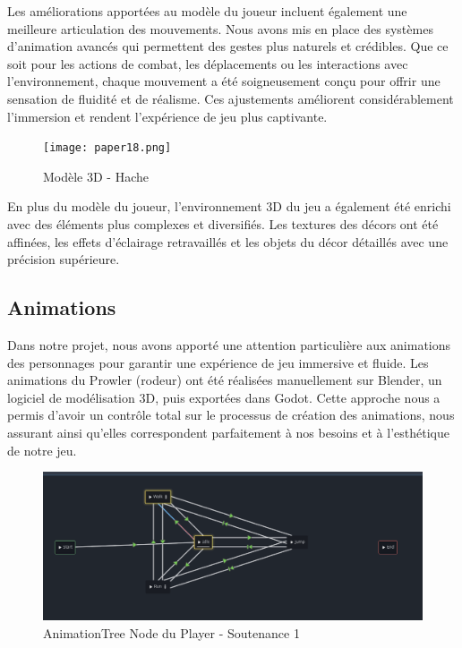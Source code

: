 \documentclass[
	article,			%
	11pt,				%
	oneside,			%
	a4paper,			%
	chapter=TITLE,
	french,			%
	sumario=tradicional
	]{base_nt}
\begin{document}
Les améliorations apportées au modèle du joueur incluent également une meilleure articulation des mouvements. Nous avons mis en place des systèmes d'animation avancés qui permettent des gestes plus naturels et crédibles. Que ce soit pour les actions de combat, les déplacements ou les interactions avec l'environnement, chaque mouvement a été soigneusement conçu pour offrir une sensation de fluidité et de réalisme. Ces ajustements améliorent considérablement l'immersion et rendent l'expérience de jeu plus captivante.

\newpage

\begin{figure}[ht]
	\caption{Modèle 3D - Hache}
	\centering
	\texttt{[image: paper18.png]}
	\legend{}
	
\end{figure}

En plus du modèle du joueur, l'environnement 3D du jeu a également été enrichi avec des éléments plus complexes et diversifiés. Les textures des décors ont été affinées, les effets d'éclairage retravaillés et les objets du décor détaillés avec une précision supérieure.

\newpage

\subsection{Animations}

Dans notre projet, nous avons apporté une attention particulière aux animations des personnages pour garantir une expérience de jeu immersive et fluide. Les animations du Prowler (rodeur) ont été réalisées manuellement sur Blender, un logiciel de modélisation 3D, puis exportées dans Godot. Cette approche nous a permis d'avoir un contrôle total sur le processus de création des animations, nous assurant ainsi qu'elles correspondent parfaitement à nos besoins et à l'esthétique de notre jeu.

\begin{figure}[ht]
	\caption{AnimationTree Node du Player - Soutenance 1}
	\centering
	\includegraphics[width=1\linewidth]{paper4.png}
	\legend{}
	
\end{figure}
\end{document}
